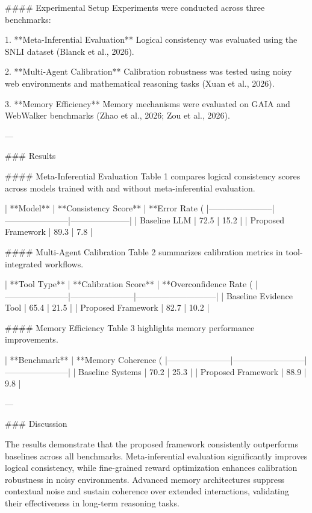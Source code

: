 #### Experimental Setup  
Experiments were conducted across three benchmarks:  

1. **Meta-Inferential Evaluation**  
   Logical consistency was evaluated using the SNLI dataset (Blanck et al., 2026).  

2. **Multi-Agent Calibration**  
   Calibration robustness was tested using noisy web environments and mathematical reasoning tasks (Xuan et al., 2026).  

3. **Memory Efficiency**  
   Memory mechanisms were evaluated on GAIA and WebWalker benchmarks (Zhao et al., 2026; Zou et al., 2026).  

---

### Results  

#### Meta-Inferential Evaluation  
Table 1 compares logical consistency scores across models trained with and without meta-inferential evaluation.  

| **Model**            | **Consistency Score** | **Error Rate (%
|-----------------------|-----------------------|---------------------|  
| Baseline LLM         | 72.5                 | 15.2               |  
| Proposed Framework   | 89.3                 | 7.8                |  

#### Multi-Agent Calibration  
Table 2 summarizes calibration metrics in tool-integrated workflows.  

| **Tool Type**         | **Calibration Score** | **Overconfidence Rate (%
|-----------------------|-----------------------|-----------------------------|  
| Baseline Evidence Tool | 65.4                 | 21.5                        |  
| Proposed Framework    | 82.7                 | 10.2                        |  

#### Memory Efficiency  
Table 3 highlights memory performance improvements.  

| **Benchmark**         | **Memory Coherence (%
|-----------------------|--------------------------|-----------------------|  
| Baseline Systems      | 70.2                    | 25.3                  |  
| Proposed Framework    | 88.9                    | 9.8                   |  

---

### Discussion  

The results demonstrate that the proposed framework consistently outperforms baselines across all benchmarks. Meta-inferential evaluation significantly improves logical consistency, while fine-grained reward optimization enhances calibration robustness in noisy environments. Advanced memory architectures suppress contextual noise and sustain coherence over extended interactions, validating their effectiveness in long-term reasoning tasks.  

